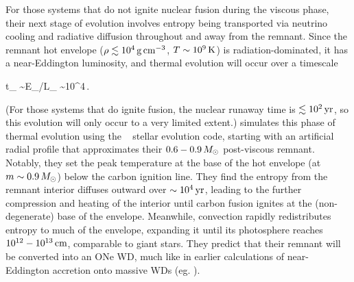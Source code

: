 


For those systems that do not ignite nuclear fusion during the viscous phase, their next stage of evolution involves entropy being transported via neutrino cooling and radiative diffusion throughout and away from the remnant.  Since the remnant hot envelope ($\rho \lesssim 10^4\,\gcc$, $T \sim 10^9\,\mathrm{K}$) is radiation-dominated, it has a near-Eddington luminosity, and thermal evolution will occur over a timescale \citep{shen+12}

\eqbegin
t_ \sim E_/L_ \sim 10^4\,.
\eqend

\noindent (For those systems that do ignite fusion, the nuclear runaway time is $\lesssim10^2\,\mathrm{yr}$, so this evolution will only occur to a very limited extent.)  \cite{shen+12} simulates this phase of thermal evolution using the \mesa\ \citep{paxt+11, paxt+13, paxt+15} stellar evolution code, starting with an artificial radial profile that approximates their $0.6-0.9\,\Msun$ post-viscous remnant.  Notably, they set the peak temperature at the base of the hot envelope (at $m \sim 0.9\,\Msun$) below the carbon ignition line.  They find the entropy from the remnant interior diffuses outward over $\sim10^4\,\mathrm{yr}$, leading to the further compression and heating of the interior until carbon fusion ignites at the (non-degenerate) base of the envelope.  Meanwhile, convection rapidly redistributes entropy to much of the envelope, expanding it until its photosphere reaches $10^{12}-10^{13}\,\mathrm{cm}$, comparable to giant stars.  They predict that their remnant will be converted into an ONe WD, much like in earlier calculations of near-Eddington accretion onto massive WDs (eg. \citealt{saion85}).

